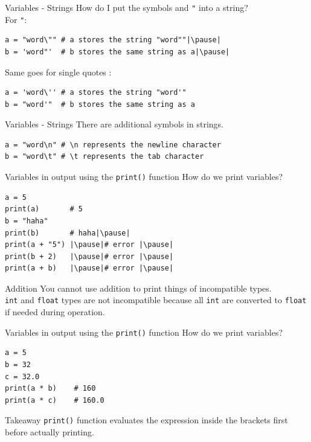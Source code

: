 \documentclass[dvipsnames, svgnames, x11names, handout]{beamer}
\begin{document}
\begin{frame}[fragile]{Variables - Strings}
How do I put the symbols \texttt{\textquotesingle} and \texttt{"} into a string?\pause\\
For \texttt{"}:\pause
	
\begin{verbatim}
a = "word\"" # a stores the string "word""|\pause|
b = 'word"'  # b stores the same string as a|\pause|
\end{verbatim}
\vspace{1em}
Same goes for single quotes \texttt{\textquotesingle}:
\begin{verbatim}
a = 'word\'' # a stores the string "word'"
b = "word'"  # b stores the same string as a
\end{verbatim}
\end{frame}

\begin{frame}[fragile]{Variables - Strings}
There are additional symbols in strings.
\begin{verbatim}
a = "word\n" # \n represents the newline character
b = "word\t" # \t represents the tab character
\end{verbatim}
\end{frame}

\begin{frame}[fragile]{Variables in output using the \texttt{print()} function}
How do we print variables?

\begin{verbatim}
a = 5
print(a)       # 5
b = "haha"
print(b)       # haha|\pause|
print(a + "5") |\pause|# error |\pause|
print(b + 2)   |\pause|# error |\pause|
print(a + b)   |\pause|# error |\pause|
\end{verbatim}
\begin{block}{Addition}
You cannot use addition to print things of incompatible types.\\
\texttt{int} and \texttt{float} types are not incompatible because all \texttt{int} are converted to \texttt{float} if needed during operation.
\end{block}
\end{frame}

\begin{frame}[fragile]{Variables in output using the \texttt{print()} function}
How do we print variables?

\begin{verbatim}
a = 5
b = 32
c = 32.0
print(a * b)    # 160
print(a * c)    # 160.0
\end{verbatim}
\pause
\begin{block}{Takeaway}
\texttt{print()} function evaluates the expression inside the brackets first before actually printing.
\end{block}
\end{frame}
\end{document}

